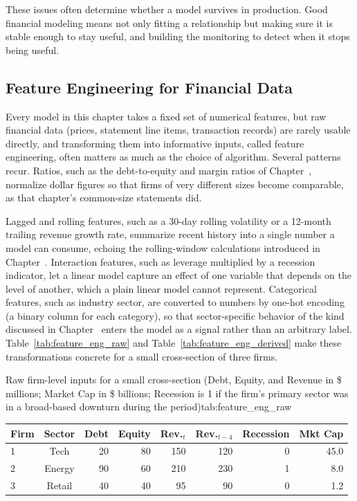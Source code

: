 \documentclass[../ai_in_finance]{subfiles}
\begin{document}
These issues often determine whether a model survives in production. Good financial modeling means not only fitting a relationship but making sure it is stable enough to stay useful, and building the monitoring to detect when it stops being useful.

\subsection{Feature Engineering for Financial Data}

Every model in this chapter takes a fixed set of numerical features, but raw financial data (prices, statement line items, transaction records) are rarely usable directly, and transforming them into informative inputs, called feature engineering, often matters as much as the choice of algorithm.
Several patterns recur. Ratios, such as the debt-to-equity and margin ratios of Chapter~, normalize dollar figures so that firms of very different sizes become comparable, as that chapter's common-size statements did.

Lagged and rolling features, such as a 30-day rolling volatility or a 12-month trailing revenue growth rate, summarize recent history into a single number a model can consume, echoing the rolling-window calculations introduced in Chapter~.
Interaction features, such as leverage multiplied by a recession indicator, let a linear model capture an effect of one variable that depends on the level of another, which a plain linear model cannot represent.
Categorical features, such as industry sector, are converted to numbers by one-hot encoding (a binary column for each category), so that sector-specific behavior of the kind discussed in Chapter~ enters the model as a signal rather than an arbitrary label. Table~\ref{tab:feature_eng_raw} and Table~\ref{tab:feature_eng_derived} make these transformations concrete for a small cross-section of three firms.

\begin{booktable}{Raw firm-level inputs for a small cross-section (Debt, Equity, and Revenue in \$ millions; Market Cap in \$ billions; Recession is 1 if the firm's primary sector was in a broad-based downturn during the period)}{tab:feature_eng_raw}
\begin{tabular}{lcrrrrrr}
\toprule
Firm & Sector & Debt & Equity & Rev.$_t$ & Rev.$_{t-4}$ & Recession & Mkt Cap \\
\midrule
1 & Tech   & 20 & 80 & 150 & 120 & 0 & 45.0 \\
2 & Energy & 90 & 60 & 210 & 230 & 1 & 8.0 \\
3 & Retail & 40 & 40 & 95  & 90  & 0 & 1.2 \\
\bottomrule
\end{tabular}
\end{booktable}
\end{document}
